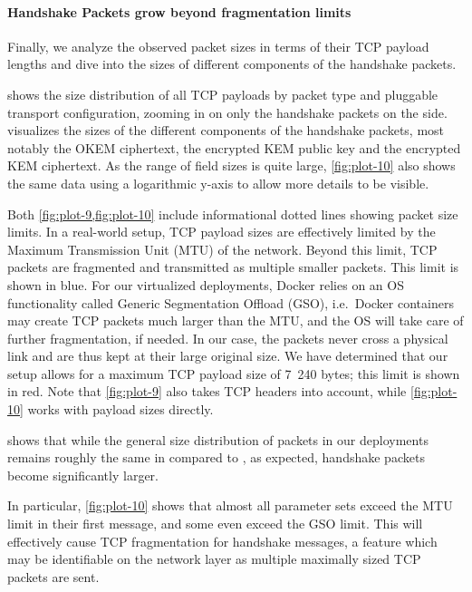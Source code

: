 \paragraph{Handshake Packets grow beyond fragmentation limits}

Finally, we analyze the observed packet sizes in terms of their TCP payload lengths and dive into the sizes of different components of the handshake packets.

 shows the size distribution of all TCP payloads by packet type and pluggable transport configuration, zooming in on only the handshake packets on the side.
 visualizes the sizes of the different components of the handshake packets, most notably the OKEM ciphertext, the encrypted KEM public key and the encrypted KEM ciphertext.
As the range of field sizes is quite large, \cref{fig:plot-10} also shows the same data using a logarithmic y-axis to allow more details to be visible.

Both \cref{fig:plot-9,fig:plot-10} include informational dotted lines showing packet size limits.
In a real-world setup, TCP payload sizes are effectively limited by the Maximum Transmission Unit (MTU) of the network. Beyond this limit, TCP packets are fragmented and transmitted as multiple smaller packets. This limit is shown in blue.
For our virtualized deployments, Docker relies on an OS functionality called Generic Segmentation Offload (GSO), i.e.~Docker containers may create TCP packets much larger than the MTU, and the OS will take care of further fragmentation, if needed. In our case, the packets never cross a physical link and are thus kept at their large original size.
We have determined that our setup allows for a maximum TCP payload size of 7~240 bytes; this limit is shown in red.
Note that \cref{fig:plot-9} also takes TCP headers into account, while \cref{fig:plot-10} works with payload sizes directly.

 shows that while the general size distribution of packets in our deployments remains roughly the same in \drivel{} compared to \obfsfour{}, as expected, handshake packets become significantly larger.

In particular, \cref{fig:plot-10} shows that almost all \drivel{} parameter sets exceed the MTU limit in their first message, and some even exceed the GSO limit. This will effectively cause TCP fragmentation for handshake messages, a feature which may be identifiable on the network layer as multiple maximally sized TCP packets are sent.

